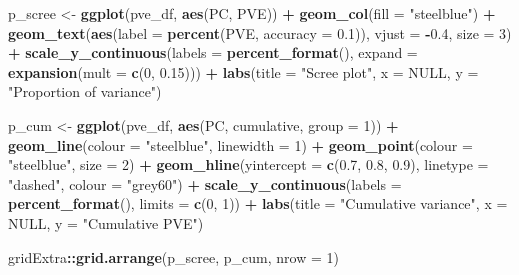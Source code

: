 \documentclass[
]{article}
\newenvironment{Shaded}{\begin{snugshade}}{\end{snugshade}}
\newcommand{\AttributeTok}[1]{\textcolor[rgb]{0.13,0.29,0.53}{#1}}
\newcommand{\ConstantTok}[1]{\textcolor[rgb]{0.56,0.35,0.01}{#1}}
\newcommand{\DecValTok}[1]{\textcolor[rgb]{0.00,0.00,0.81}{#1}}
\newcommand{\FloatTok}[1]{\textcolor[rgb]{0.00,0.00,0.81}{#1}}
\newcommand{\FunctionTok}[1]{\textcolor[rgb]{0.13,0.29,0.53}{\textbf{#1}}}
\newcommand{\NormalTok}[1]{#1}
\newcommand{\OtherTok}[1]{\textcolor[rgb]{0.56,0.35,0.01}{#1}}
\newcommand{\SpecialCharTok}[1]{\textcolor[rgb]{0.81,0.36,0.00}{\textbf{#1}}}
\newcommand{\StringTok}[1]{\textcolor[rgb]{0.31,0.60,0.02}{#1}}
\begin{document}
\begin{Shaded}
\begin{Highlighting}[]
\NormalTok{p\_scree }\OtherTok{\textless{}{-}} \FunctionTok{ggplot}\NormalTok{(pve\_df, }\FunctionTok{aes}\NormalTok{(PC, PVE)) }\SpecialCharTok{+}
  \FunctionTok{geom\_col}\NormalTok{(}\AttributeTok{fill =} \StringTok{"steelblue"}\NormalTok{) }\SpecialCharTok{+}
  \FunctionTok{geom\_text}\NormalTok{(}\FunctionTok{aes}\NormalTok{(}\AttributeTok{label =} \FunctionTok{percent}\NormalTok{(PVE, }\AttributeTok{accuracy =} \FloatTok{0.1}\NormalTok{)),}
            \AttributeTok{vjust =} \SpecialCharTok{{-}}\FloatTok{0.4}\NormalTok{, }\AttributeTok{size =} \DecValTok{3}\NormalTok{) }\SpecialCharTok{+}
  \FunctionTok{scale\_y\_continuous}\NormalTok{(}\AttributeTok{labels =} \FunctionTok{percent\_format}\NormalTok{(),}
                     \AttributeTok{expand =} \FunctionTok{expansion}\NormalTok{(}\AttributeTok{mult =} \FunctionTok{c}\NormalTok{(}\DecValTok{0}\NormalTok{, }\FloatTok{0.15}\NormalTok{))) }\SpecialCharTok{+}
  \FunctionTok{labs}\NormalTok{(}\AttributeTok{title =} \StringTok{"Scree plot"}\NormalTok{, }\AttributeTok{x =} \ConstantTok{NULL}\NormalTok{, }\AttributeTok{y =} \StringTok{"Proportion of variance"}\NormalTok{)}

\NormalTok{p\_cum }\OtherTok{\textless{}{-}} \FunctionTok{ggplot}\NormalTok{(pve\_df, }\FunctionTok{aes}\NormalTok{(PC, cumulative, }\AttributeTok{group =} \DecValTok{1}\NormalTok{)) }\SpecialCharTok{+}
  \FunctionTok{geom\_line}\NormalTok{(}\AttributeTok{colour =} \StringTok{"steelblue"}\NormalTok{, }\AttributeTok{linewidth =} \DecValTok{1}\NormalTok{) }\SpecialCharTok{+}
  \FunctionTok{geom\_point}\NormalTok{(}\AttributeTok{colour =} \StringTok{"steelblue"}\NormalTok{, }\AttributeTok{size =} \DecValTok{2}\NormalTok{) }\SpecialCharTok{+}
  \FunctionTok{geom\_hline}\NormalTok{(}\AttributeTok{yintercept =} \FunctionTok{c}\NormalTok{(}\FloatTok{0.7}\NormalTok{, }\FloatTok{0.8}\NormalTok{, }\FloatTok{0.9}\NormalTok{),}
             \AttributeTok{linetype =} \StringTok{"dashed"}\NormalTok{, }\AttributeTok{colour =} \StringTok{"grey60"}\NormalTok{) }\SpecialCharTok{+}
  \FunctionTok{scale\_y\_continuous}\NormalTok{(}\AttributeTok{labels =} \FunctionTok{percent\_format}\NormalTok{(), }\AttributeTok{limits =} \FunctionTok{c}\NormalTok{(}\DecValTok{0}\NormalTok{, }\DecValTok{1}\NormalTok{)) }\SpecialCharTok{+}
  \FunctionTok{labs}\NormalTok{(}\AttributeTok{title =} \StringTok{"Cumulative variance"}\NormalTok{,}
       \AttributeTok{x =} \ConstantTok{NULL}\NormalTok{, }\AttributeTok{y =} \StringTok{"Cumulative PVE"}\NormalTok{)}

\NormalTok{gridExtra}\SpecialCharTok{::}\FunctionTok{grid.arrange}\NormalTok{(p\_scree, p\_cum, }\AttributeTok{nrow =} \DecValTok{1}\NormalTok{)}
\end{Highlighting}
\end{Shaded}
\end{document}
